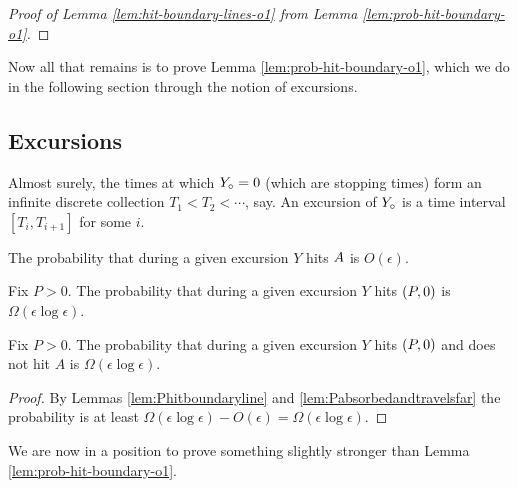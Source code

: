 {\begin{proof}[Proof of Lemma \ref{lem:hit-boundary-lines-o1} from
    Lemma \ref{lem:prob-hit-boundary-o1}]
\end{proof}

Now all that remains is to prove Lemma \ref{lem:prob-hit-boundary-o1},
which we do in the following section through the notion of excursions.

\subsection{Excursions}

\newcommand{\excursionstart}{T}

\begin{definition*}
  Almost surely, the times at which $Y_\circ = 0$ (which are stopping
  times) form an infinite discrete collection $\excursionstart_1 <
  \excursionstart_2 < \cdots$, say.  An excursion of $Y_\circ$ is a
  time interval $[\excursionstart_i, \excursionstart_{i+1}]$ for some
  $i$.
\end{definition*}

\newcommand{\Omegaeloge}{\Omega(\epsilon\log\epsilon)}

\newcommand{\probexcursion}[2]{The probability that during a given
  excursion #1 is #2.}

\begin{lemma}
  \label{lem:Phitboundaryline}
  \probexcursion{$Y$ hits $A$}{$O(\epsilon)$}
\end{lemma}

\begin{lemma}
  \label{lem:Pabsorbedandtravelsfar}
  Fix $P > 0$. \probexcursion{$Y$ hits $(P,0)$}{$\Omegaeloge$}
\end{lemma}

\begin{lemma*}
  Fix $P > 0$.  \probexcursion{$Y$ hits $(P,0)$ and does not hit
    $A$}{$\Omegaeloge$}
\end{lemma*}

\begin{proof}
  By Lemmas \ref{lem:Phitboundaryline} and
  \ref{lem:Pabsorbedandtravelsfar} the probability is at least
  $\Omegaeloge - O(\epsilon) = \Omegaeloge$.
\end{proof}

We are now in a position to prove something slightly stronger than
Lemma \ref{lem:prob-hit-boundary-o1}.

\begin{lemma*}
\end{lemma*}

}
